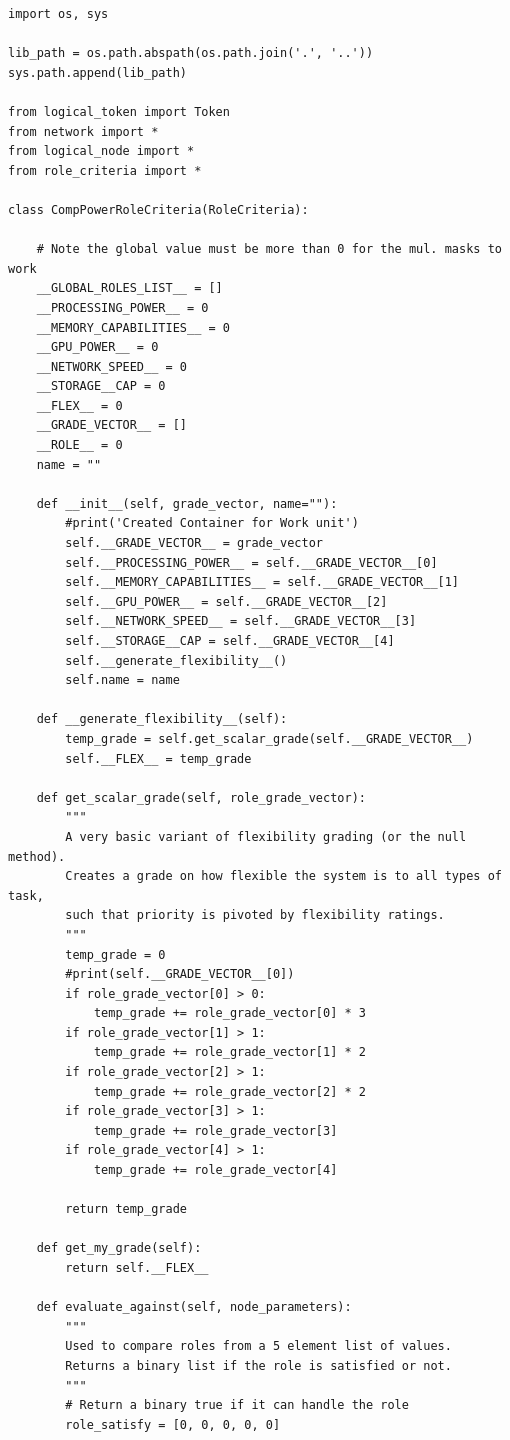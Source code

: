\documentclass[11pt]{article}
\begin{document}
\lstset{frame=single, caption=Example Framework Listing in Python}
\begin{lstlisting}
import os, sys

lib_path = os.path.abspath(os.path.join('.', '..'))
sys.path.append(lib_path)

from logical_token import Token
from network import *
from logical_node import *
from role_criteria import *

class CompPowerRoleCriteria(RoleCriteria):

    # Note the global value must be more than 0 for the mul. masks to work
    __GLOBAL_ROLES_LIST__ = []
    __PROCESSING_POWER__ = 0
    __MEMORY_CAPABILITIES__ = 0
    __GPU_POWER__ = 0
    __NETWORK_SPEED__ = 0
    __STORAGE__CAP = 0
    __FLEX__ = 0
    __GRADE_VECTOR__ = []
    __ROLE__ = 0
    name = ""

    def __init__(self, grade_vector, name=""):
        #print('Created Container for Work unit')
        self.__GRADE_VECTOR__ = grade_vector
        self.__PROCESSING_POWER__ = self.__GRADE_VECTOR__[0]
        self.__MEMORY_CAPABILITIES__ = self.__GRADE_VECTOR__[1]
        self.__GPU_POWER__ = self.__GRADE_VECTOR__[2]
        self.__NETWORK_SPEED__ = self.__GRADE_VECTOR__[3]
        self.__STORAGE__CAP = self.__GRADE_VECTOR__[4]
        self.__generate_flexibility__()
        self.name = name

    def __generate_flexibility__(self):
        temp_grade = self.get_scalar_grade(self.__GRADE_VECTOR__)
        self.__FLEX__ = temp_grade

    def get_scalar_grade(self, role_grade_vector):
        """
        A very basic variant of flexibility grading (or the null method).
        Creates a grade on how flexible the system is to all types of task,
        such that priority is pivoted by flexibility ratings.
        """
        temp_grade = 0
        #print(self.__GRADE_VECTOR__[0])
        if role_grade_vector[0] > 0:
            temp_grade += role_grade_vector[0] * 3
        if role_grade_vector[1] > 1:
            temp_grade += role_grade_vector[1] * 2
        if role_grade_vector[2] > 1:
            temp_grade += role_grade_vector[2] * 2
        if role_grade_vector[3] > 1:
            temp_grade += role_grade_vector[3]
        if role_grade_vector[4] > 1:
            temp_grade += role_grade_vector[4]

        return temp_grade

    def get_my_grade(self):
        return self.__FLEX__

    def evaluate_against(self, node_parameters):
        """
        Used to compare roles from a 5 element list of values.
        Returns a binary list if the role is satisfied or not.
        """
        # Return a binary true if it can handle the role
        role_satisfy = [0, 0, 0, 0, 0]


\end{lstlisting}
\end{document}
